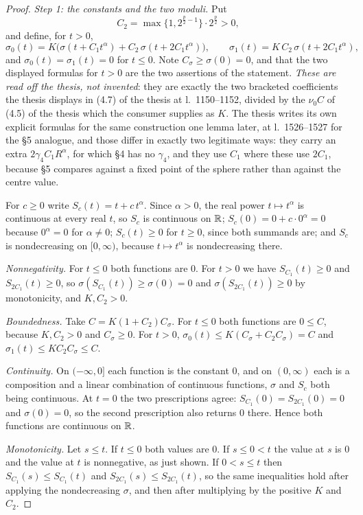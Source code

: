 \begin{proof}
\emph{Step 1: the constants and the two moduli.}  Put
\[
C_2=\max\bigl\{1,2^{\frac p2-1}\bigr\}\cdot2^{\frac p2}>0,
\]
and define, for $t>0$,
\[
\sigma_0(t)=K\bigl(\sigma(t+C_1t^{\alpha})+C_2\,\sigma(t+2C_1t^{\alpha})\bigr),
\qquad
\sigma_1(t)=K\,C_2\,\sigma(t+2C_1t^{\alpha}),
\]
and $\sigma_0(t)=\sigma_1(t)=0$ for $t\le0$.  Note $C_\sigma\ge\sigma(0)=0$, and
that the two displayed formulas for $t>0$ are the two assertions of the
statement.  \emph{These are read off the thesis, not invented}: they are
exactly the two bracketed coefficients the thesis displays in
(4.7) of the thesis at l.~1150--1152, divided by the $\nu_0C$ of (4.5) of the thesis
which the consumer supplies as $K$.  The thesis writes its own explicit
formulas for the same construction one lemma later, at l.~1526--1527 for the
\S5 analogue, and those differ in exactly two legitimate ways: they carry an
extra $2\gamma_4C_1R^{\alpha}$, for which \S4 has no $\gamma_4$, and they use
$C_1$ where these use $2C_1$, because \S5 compares against a fixed point of the
sphere rather than against the centre value.

For $c\ge0$ write $S_c(t)=t+c\,t^{\alpha}$.  Since $\alpha>0$, the real power
$t\mapsto t^{\alpha}$ is continuous at every real $t$, so $S_c$ is continuous on
$\mathbb{R}$; $S_c(0)=0+c\cdot0^{\alpha}=0$ because $0^{\alpha}=0$ for $\alpha\ne0$;
$S_c(t)\ge0$ for $t\ge0$, since both summands are; and $S_c$ is nondecreasing on
$[0,\infty)$, because $t\mapsto t^{\alpha}$ is nondecreasing there.

\emph{Nonnegativity.}  For $t\le0$ both functions are $0$.  For $t>0$ we have
$S_{C_1}(t)\ge0$ and $S_{2C_1}(t)\ge0$, so
$\sigma(S_{C_1}(t))\ge\sigma(0)=0$ and $\sigma(S_{2C_1}(t))\ge0$ by
monotonicity, and $K,C_2>0$.

\emph{Boundedness.}  Take $C=K(1+C_2)C_\sigma$.  For $t\le0$ both functions are
$0\le C$, because $K,C_2>0$ and $C_\sigma\ge0$.  For $t>0$,
$\sigma_0(t)\le K(C_\sigma+C_2C_\sigma)=C$ and
$\sigma_1(t)\le KC_2C_\sigma\le C$.

\emph{Continuity.}  On $(-\infty,0]$ each function is the constant $0$, and on
$(0,\infty)$ each is a composition and a linear combination of continuous
functions, $\sigma$ and $S_c$ both being continuous.  At $t=0$ the two
prescriptions agree: $S_{C_1}(0)=S_{2C_1}(0)=0$ and $\sigma(0)=0$, so the
second prescription also returns $0$ there.  Hence both functions are
continuous on $\mathbb{R}$.

\emph{Monotonicity.}  Let $s\le t$.  If $t\le0$ both values are $0$.  If
$s\le0<t$ the value at $s$ is $0$ and the value at $t$ is nonnegative, as just
shown.  If $0<s\le t$ then $S_{C_1}(s)\le S_{C_1}(t)$ and
$S_{2C_1}(s)\le S_{2C_1}(t)$, so the same inequalities hold after applying the
nondecreasing $\sigma$, and then after multiplying by the positive $K$ and
$C_2$.


\end{proof}
